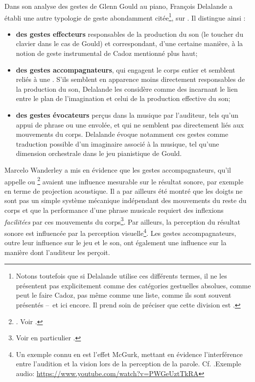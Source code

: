 \noindent Dans son analyse des gestes de Glenn Gould au piano, François Delalande a établi une autre typologie de geste abondamment citée\footnote{Notons toutefois que si Delalande utilise ces différents termes, il ne les présentent pas explicitement comme des catégories gestuelles absolues, comme peut le faire Cadoz, pas même comme une liste, comme ils sont souvent présentés --~et ici encore. Il prend soin de préciser que cette division est  \cite{delalande_geste_1988}.}, sur . Il distingue ainsi :
\vspace{-1em}
\begin{itemize}[noitemsep]
	\item \textbf{des gestes effecteurs} responsables de la production du son (le toucher du clavier dans le cas de Gould) et correspondant, d'une certaine manière, à la notion de geste instrumental de Cadoz mentionné plus haut;
	\item \textbf{des gestes accompagnateurs}, qui engagent le corps entier et semblent reliés à une . S'ils semblent en apparence moins directement responsables de la production du son, Delalande les considère comme des  incarnant le lien entre le plan de l'imagination et celui de la production effective du son;
	\item \textbf{des gestes évocateurs} perçus dans la musique par l'auditeur, tels qu'un appui de phrase ou une envolée, et qui ne semblent pas directement liés aux mouvements du corps. Delalande évoque notamment ces gestes comme traduction possible d'un imaginaire associé à la musique, tel qu'une dimension orchestrale dans le jeu pianistique de Gould.
\end{itemize}
\noindent Marcelo Wanderley a mis en évidence que les gestes accompagnateurs, qu'il appelle  ou \footnote{. Voir \cite{wanderley_non-obvious_1999}.} avaient une influence mesurable sur le résultat sonore, par exemple en terme de projection acoustique. Il a par ailleurs été montré que les doigts ne sont pas un simple système mécanique indépendant des mouvements du reste du corps et que la performance d'une phrase musicale requiert des inflexions \textit{facilitées} par ces mouvements du corps\footnote{Voir en particulier \cite{chadefaux_experimental_2012}.}. Par ailleurs, la perception du résultat sonore est influencée par la perception visuelle\footnote{\label{fn:mcgurk} Un exemple connu en est l'effet McGurk, mettant en évidence l'interférence entre l'audition et la vision lors de la perception de la parole. Cf. \cite{macdonald_visual_1978}.Exemple audio: \url{https://www.youtube.com/watch?v=PWGeUztTkRA}}. Les gestes accompagnateurs, outre leur influence sur le jeu et le son, ont également une influence sur la manière dont l'auditeur les perçoit.

